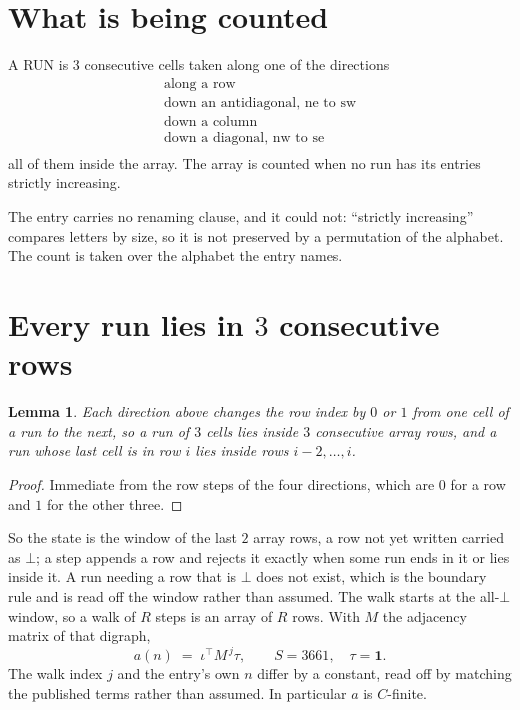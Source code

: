 \documentclass[11pt,a4paper]{article}
\theoremstyle{plain}
\newtheorem{lemma}[theorem]{Lemma}
\theoremstyle{definition}
\begin{document}
\section{What is being counted}

A RUN is $3$ consecutive cells taken along one of the directions
\[
\begin{array}{l}
\text{along a row} \\
\text{down an antidiagonal, ne to sw} \\
\text{down a column} \\
\text{down a diagonal, nw to se} \\
\end{array}
\]
all of them inside the array. The array is counted when no run has its entries strictly increasing.


The entry carries no renaming clause, and it could not: ``strictly increasing'' compares
letters by size, so it is not preserved by a permutation of the alphabet. The count is taken
over the alphabet the entry names.

\section{Every run lies in $3$ consecutive rows}

\begin{lemma}\label{lem:win}
Each direction above changes the row index by $0$ or $1$ from one cell of a run to the next, so
a run of $3$ cells lies inside $3$ consecutive array rows, and a run whose last cell is in
row $i$ lies inside rows $i-2,\dots,i$.
\end{lemma}

\begin{proof}
Immediate from the row steps of the four directions, which are $0$ for a row and $1$ for the
other three.
\end{proof}

So the state is the window of the last $2$ array rows, a row not yet written carried as
$\bot$; a step appends a row and rejects it exactly when some run ends in it or lies inside it.
A run needing a row that is $\bot$ does not exist, which is the boundary rule and is read off
the window rather than assumed. The walk starts at the all-$\bot$ window, so a walk of $R$ steps
is an array of $R$ rows. With $M$ the adjacency matrix of that digraph,
\[
a(n)\;=\;\iota^{\!\top}M^{\,j}\tau ,\qquad S=3661,\quad\tau=\mathbf{1} .
\]
The walk index $j$ and the entry's own $n$ differ by a constant, read off by matching the
published terms rather than assumed. In particular $a$ is $C$-finite.
\end{document}
